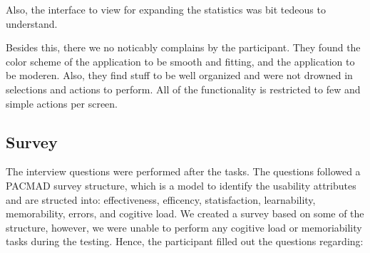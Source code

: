 Also, the interface to view for expanding the statistics was bit tedeous to understand. 

Besides this, there we no noticably complains by the participant. They found the color scheme of the application to be smooth and fitting, and the application to be moderen. Also, they find stuff to be well organized and were not drowned in selections and actions to perform. All of the functionality is restricted to few and simple actions per screen. 

\subsection{Survey}
The interview questions were performed after the tasks. The questions followed a PACMAD survey structure, which is a model to identify the usability attributes and are structed into: effectiveness, efficency, statisfaction, learnability, memorability, errors, and cogitive load. We created a survey based on some of the structure, however, we were unable to perform any cogitive load or memoriability tasks during the testing. Hence, the participant filled out the questions regarding: 

